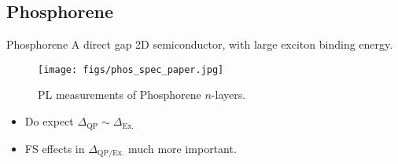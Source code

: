 \documentclass[10pt, pdf, hyperref={draft}, usenames, dvipsnames]{beamer}
\newcommand{\red}[1]{{\bf\color{LancsRed}{#1}}}
\newcommand{\blue}[1]{{\bf\color{NavyBlue}{#1}}}
\begin{document}


\subsection{Phosphorene}


\begin{frame}{Phosphorene}
A direct gap 2D semiconductor, with large exciton binding
energy.

\begin{figure}[H]
  \centering
  \texttt{[image: figs/phos\_spec\_paper.jpg]}
  \caption{PL measurements of Phosphorene $n$-layers.}
\label{fig:phos_spec_paper}
\end{figure}

\begin{itemize}
  \item Do \red{not} expect $\Delta_{\text{QP}} \sim \Delta_{\text{Ex.}}$
  \item FS effects in $\Delta_{\text{QP/Ex.}}$ much more important.
\end{itemize}
\end{frame}
\end{document}
